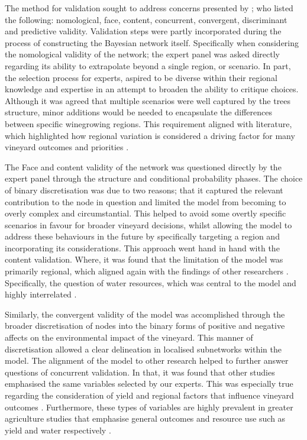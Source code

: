 The method for validation sought to address concerns presented by \citep{pitchforthProposedValidationFramework2013}; who listed the following:  nomological, face, content, concurrent, convergent, discriminant and predictive validity. Validation steps were partly incorporated during the process of constructing the Bayesian network itself. Specifically when considering the nomological validity of the network; the expert panel was asked directly regarding its ability to extrapolate beyond a single region, or scenario. In part, the selection process for experts, aspired to be diverse within their regional knowledge and expertise in an attempt to broaden the ability to critique choices. Although it was agreed that multiple scenarios were well captured by the trees structure, minor additions would be needed to encapsulate the differences between specific winegrowing regions. This requirement aligned with literature, which highlighted how regional variation is considered a driving factor for many vineyard outcomes and priorities \citep{abbalDecisionSupportSystem2016,agostaRegionalClimateVariability2012,soarClimateDriversRed2008}.

The Face and content validity of the network was questioned directly by the expert panel through the structure and conditional probability phases. The choice of binary discretisation was due to two reasons; that it captured the relevant contribution to the node in question and limited the model from becoming to overly complex and circumstantial. This helped to avoid some overtly specific scenarios in favour for broader vineyard decisions, whilst allowing the model to address these behaviours in the future by specifically targeting a region and incorporating its considerations. This approach went hand in hand with the content validation. Where, it was found that the limitation of the model was primarily regional, which aligned again with the findings of other researchers \citep{abbalDecisionSupportSystem2016,ellisUsingBayesianGrowth2020,agostaRegionalClimateVariability2012,barriguinhaVineyardYieldEstimation2021,brockRelationSoilOrganic2011}. Specifically, the question of water resources, which was central to the model and highly interrelated \citep{carmonaUseParticipatoryObjectOriented2011}.

Similarly, the convergent validity of the model was accomplished through the broader discretisation of nodes into the binary forms of positive and negative affects on the environmental impact of the vineyard. This manner of discretisation allowed a clear delineation in localised subnetworks within the model. The alignment of the model to other research helped to further answer questions of concurrent validation. In that, it was found that other studies emphasised the same variables selected by our experts. This was especially true regarding the consideration of yield and regional factors that influence vineyard outcomes \cite{abbalDecisionSupportSystem2016,campsGrapeHarvestYield2012,hallWithinseasonTemporalVariation2011}. Furthermore, these types of variables are highly prevalent in greater agriculture studies that emphasise general outcomes and resource use such as yield and water respectively \citep{heFruitYieldPrediction2022,laurentLocalInfluenceClimate2022}.


